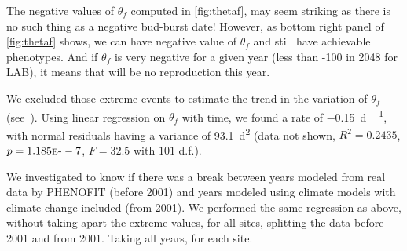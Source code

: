 The negative values of $\theta_f$ computed in \autoref{fig:thetaf}, may seem striking as there is no such thing as a negative bud-burst date! However, as bottom right panel of \autoref{fig:thetaf} shows, we can have negative value of $\theta_f$ and still have achievable phenotypes. And if $\theta_f$ is very negative for a given year (less than -100 in 2048 for LAB), it means that will be no reproduction this year.

We excluded those extreme events to estimate the trend in the variation of $\theta_f$ (see~). Using linear regression on $\theta_f$ with time, we found a rate of \SI{-0.15}{\day\per\year}, with normal residuals having a variance of \SI{93.1}{\day\squared} (data not shown, $R^2=0.2435$, $p=1.185\text{\sc{e}-}-7$, $F=32.5$ with $101$ d.f.).

We investigated to know if there was a break between years modeled from real data by \textsc{PHENOFIT} (before 2001) and years modeled using climate models with climate change included (from 2001). We performed the same regression as above, without taking apart the extreme values, for all sites, splitting the data before 2001 and from 2001. Taking all years, for each site.